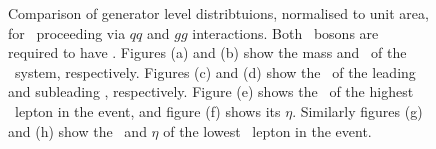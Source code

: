 \begin{figure}
{    }
        \vspace{-2mm}
        \vspace{-2mm}
    \caption{\small Comparison of generator level distribtuions, normalised to
    unit area, for \ZZllll\ proceeding via $qq$ and $gg$ interactions. Both \Z\
    bosons are required to have \sstooosZ. Figures (a)
    and (b) show the mass and \pt\ of the \ZZ\ system,
    respectively. Figures (c) and (d) show the \pt\ of the
    leading and subleading \Z, respectively. Figure (e) shows the \pt\ of the highest \pt\ lepton in the event, and figure (f) shows its
   $\eta$. Similarly figures (g) and (h) show the \pt\ and $\eta$ of the lowest
   \pt\ lepton in the event.}
    \label{fig:gen-comp-7-8-ZZ}
\end{figure}

